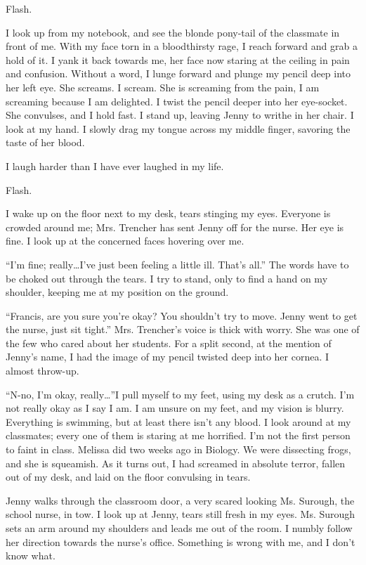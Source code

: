 Flash.



I look up from my notebook, and see the blonde pony-tail of the
classmate in front of me. With my face torn in a bloodthirsty rage,
I reach forward and grab a hold of it. I yank it back towards me,
her face now staring at the ceiling in pain and confusion. Without
a word, I lunge forward and plunge my pencil deep into her left
eye. She screams. I scream. She is screaming from the pain, I am
screaming because I am delighted. I twist the pencil deeper into
her eye-socket. She convulses, and I hold fast. I stand up, leaving
Jenny to writhe in her chair. I look at my hand. I slowly drag my
tongue across my middle finger, savoring the taste of her
blood.

I laugh harder than I have ever laughed in my life.



Flash.



I wake up on the floor next to my desk, tears stinging my eyes.
Everyone is crowded around me; Mrs. Trencher has sent Jenny off for
the nurse. Her eye is fine. I look up at the concerned faces
hovering over me.

``I'm fine; really{\ldots}I've just been feeling a
little ill. That's all.'' The words have to be choked
out through the tears. I try to stand, only to find a hand on my
shoulder, keeping me at my position on the ground.

``Francis, are you sure you're okay? You shouldn't
try to move. Jenny went to get the nurse, just sit tight.''
Mrs. Trencher's voice is thick with worry. She was one of the
few who cared about her students. For a split second, at the
mention of Jenny's name, I had the image of my pencil twisted
deep into her cornea. I almost throw-up.

``N-no, I'm okay, really{\ldots}''I pull myself to
my feet, using my desk as a crutch. I'm not really okay as I
say I am. I am unsure on my feet, and my vision is blurry.
Everything is swimming, but at least there isn't any blood. I
look around at my classmates; every one of them is staring at me
horrified. I'm not the first person to faint in class.
Melissa did two weeks ago in Biology. We were dissecting frogs, and
she is squeamish. As it turns out, I had screamed in absolute
terror, fallen out of my desk, and laid on the floor convulsing in
tears.

Jenny walks through the classroom door, a very scared looking Ms.
Surough, the school nurse, in tow. I look up at Jenny, tears still
fresh in my eyes. Ms. Surough sets an arm around my shoulders and
leads me out of the room. I numbly follow her direction towards the
nurse's office. Something is wrong with me, and I don't
know what.


